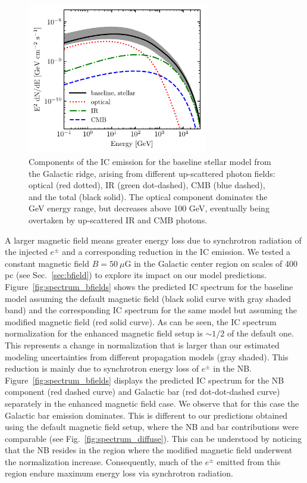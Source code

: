 \documentclass[doublespace,nopageskip]{VTthesis} %
\begin{document}
\begin{figure}[htb]
    \centering
    \includegraphics[width=0.7\textwidth]{Figures/IC_MSPs/ics_spectrum_components.pdf}
    \caption{Components of the IC emission for the baseline stellar model from the Galactic ridge, arising from different up-scattered photon fields: optical (red dotted), IR (green dot-dashed), CMB (blue dashed), and the total (black solid). The optical component dominates the GeV energy range, but decreases above 100 GeV, eventually being overtaken by up-scattered IR and CMB photons.}
    \label{fig:spectrum_comp}
\end{figure}

A larger magnetic field means greater energy loss due to synchrotron radiation of the injected $e^\pm$ and a corresponding reduction in the IC emission. We tested a constant magnetic field $B = 50\ \mu$G in the Galactic center region on scales of 400 pc (see Sec.~\ref{sec:bfield}) to explore its impact on our model predictions. Figure~\ref{fig:spectrum_bfields} shows the predicted IC spectrum for the baseline model assuming the default magnetic field (black solid curve with gray shaded band) and the corresponding IC spectrum for the same model but assuming the modified magnetic field (red solid curve). As can be seen, the IC spectrum normalization for the enhanced magnetic field setup is $\sim 1/2$ of the default one. This represents a change in normalization that is larger than our estimated modeling uncertainties from different propagation models (gray shaded). This reduction is mainly due to synchrotron energy loss of $e^\pm$ in the NB. Figure~\ref{fig:spectrum_bfields}  displays the predicted IC spectrum for the NB component (red dashed curve) and Galactic bar (red dot-dot-dashed curve) separately in the enhanced magnetic field case. We observe that for this case the Galactic bar emission dominates. This is different to our predictions obtained using the default magnetic field setup, where the NB and bar  contributions were comparable (see Fig.~\ref{fig:spectrum_diffuse}). This can be understood by noticing that the NB resides in the region where the modified magnetic field underwent the normalization increase. Consequently, much of the $e^\pm$ emitted from this region endure maximum energy loss via synchrotron radiation.
\end{document}
